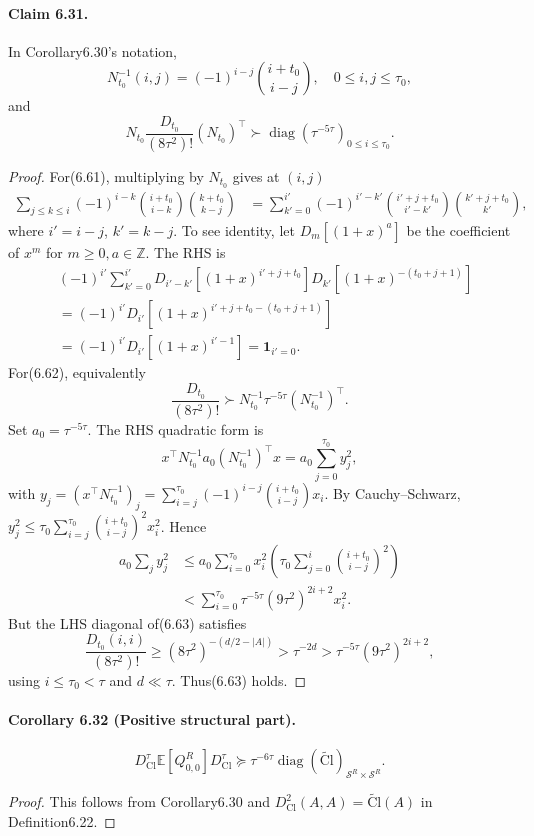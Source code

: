 \paragraph{Claim 6.31.} In Corollary6.30's notation,
\[N_{t_0}^{-1}(i,j)=(-1)^{i-j}\binom{i+t_0}{i-j},\quad0\le i,j\le\tau_0,\tag{6.61}\]
and
\[N_{t_0}\frac{D_{t_0}}{(8\tau^2)!}(N_{t_0})^\top\succ\operatorname{diag}(\tau^{-5\tau})_{0\le i\le\tau_0}.\tag{6.62}\]
\begin{proof}For(6.61), multiplying by $N_{t_0}$ gives at $(i,j)$
\begin{align*}\sum_{j\le k\le i}(-1)^{i-k}\binom{i+t_0}{i-k}\binom{k+t_0}{k-j}&=\sum_{k'=0}^{i'}(-1)^{i'-k'}\binom{i'+j+t_0}{i'-k'}\binom{k'+j+t_0}{k'},\end{align*}
where $i'=i-j$, $k'=k-j$. To see identity, let $D_m[(1+x)^a]$ be the coefficient of $x^m$ for $m\ge0,a\in\mathbb Z$. The RHS is
\begin{align*}&(-1)^{i'}\sum_{k'=0}^{i'}D_{i'-k'}[(1+x)^{i'+j+t_0}]D_{k'}[(1+x)^{-(t_0+j+1)}]\\&=(-1)^{i'}D_{i'}[(1+x)^{i'+j+t_0-(t_0+j+1)}]\\&=(-1)^{i'}D_{i'}[(1+x)^{i'-1}]=\mathbf1_{i'=0}.
\end{align*}
For(6.62), equivalently
\[\frac{D_{t_0}}{(8\tau^2)!}\succ N_{t_0}^{-1}\tau^{-5\tau}(N_{t_0}^{-1})^\top.\tag{6.63}\]
Set $a_0=\tau^{-5\tau}$. The RHS quadratic form is
\[x^\top N_{t_0}^{-1}a_0(N_{t_0}^{-1})^\top x=a_0\sum_{j=0}^{\tau_0}y_j^2,\tag{6.64}\]
with $y_j=(x^\top N_{t_0}^{-1})_j=\sum_{i=j}^{\tau_0}(-1)^{i-j}\binom{i+t_0}{i-j}x_i$. By Cauchy--Schwarz, $y_j^2\le\tau_0\sum_{i=j}^{\tau_0}\binom{i+t_0}{i-j}^2x_i^2$. Hence
\begin{align*}a_0\sum_jy_j^2&\le a_0\sum_{i=0}^{\tau_0}x_i^2\left(\tau_0\sum_{j=0}^i\binom{i+t_0}{i-j}^2\right)\\&<\sum_{i=0}^{\tau_0}\tau^{-5\tau}(9\tau^2)^{2i+2}x_i^2.\end{align*}
But the LHS diagonal of(6.63) satisfies
\[\frac{D_{t_0}(i,i)}{(8\tau^2)!}\ge(8\tau^2)^{-(d/2-|A|)}>\tau^{-2d}>\tau^{-5\tau}(9\tau^2)^{2i+2},\]
using $i\le\tau_0<\tau$ and $d\ll\tau$. Thus(6.63) holds.\end{proof}
\paragraph{Corollary 6.32 (Positive structural part).}
\[D_{\mathrm{Cl}}^\tau\mathbb E[Q_{0,0}^R]D_{\mathrm{Cl}}^\tau\succeq\tau^{-6\tau}\operatorname{diag}(\widetilde{\mathrm{Cl}})_{\mathcal S^R\times\mathcal S^R}.\]
\begin{proof}This follows from Corollary6.30 and $D_{\mathrm{Cl}}^2(A,A)=\widetilde{\mathrm{Cl}}(A)$ in Definition6.22.\end{proof}
